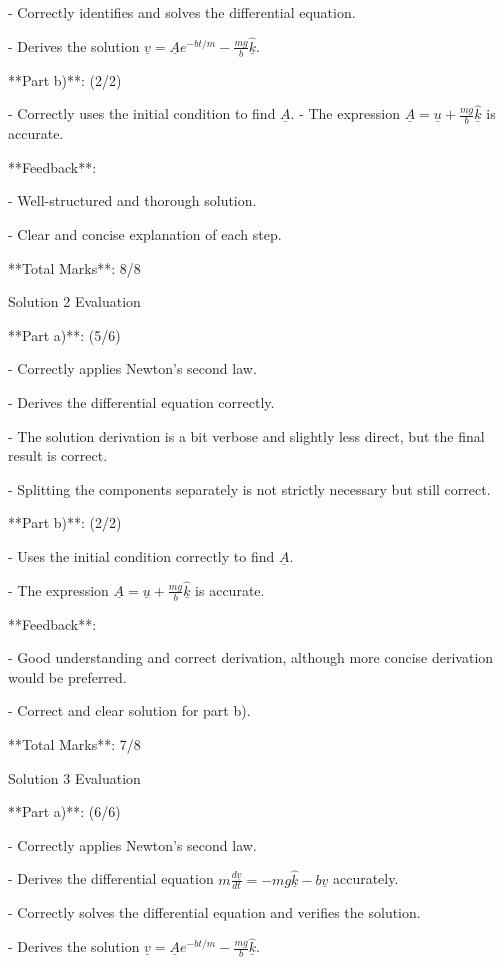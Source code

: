\documentclass[a4paper,11pt]{article}
\begin{document}
- Correctly identifies and solves the differential equation.

- Derives the solution \( \underline{v} = \underline{A} e^{-bt/m} - \frac{mg}{b} \hat{\underline{k}} \).

**Part b)**: (2/2)

- Correctly uses the initial condition to find \( \underline{A} \).
- The expression \( \underline{A} = \underline{u} + \frac{mg}{b} \hat{\underline{k}} \) is accurate.

**Feedback**: 

- Well-structured and thorough solution. 

- Clear and concise explanation of each step. 

**Total Marks**: 8/8

Solution 2 Evaluation

**Part a)**: (5/6)

- Correctly applies Newton's second law.

- Derives the differential equation correctly.

- The solution derivation is a bit verbose and slightly less direct, but the final result is correct.

- Splitting the components separately is not strictly necessary but still correct.

**Part b)**: (2/2)

- Uses the initial condition correctly to find \( \underline{A} \).

- The expression \( \underline{A} = \underline{u} + \frac{mg}{b} \hat{\underline{k}} \) is accurate.

**Feedback**: 

- Good understanding and correct derivation, although more concise derivation would be preferred.

- Correct and clear solution for part b).

**Total Marks**: 7/8

Solution 3 Evaluation

**Part a)**: (6/6)

- Correctly applies Newton's second law.

- Derives the differential equation \( m\frac{d\underline{v}}{dt} = -mg \hat{\underline{k}} - b\underline{v} \) accurately.

- Correctly solves the differential equation and verifies the solution.

- Derives the solution \( \underline{v} = \underline{A} e^{-bt/m} - \frac{mg}{b} \hat{\underline{k}} \).
\end{document}
